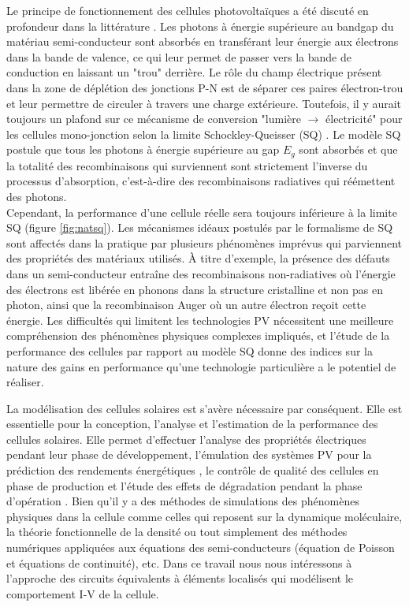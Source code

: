 Le principe de fonctionnement des cellules photovoltaïques a été discuté en profondeur dans la littérature \cite{Fraas2010,  Sze2006, Wenham2013}.
Les photons à énergie supérieure au bandgap du matériau semi-conducteur sont absorbés en transférant leur énergie aux électrons dans la bande de valence, ce qui leur permet de passer vers la bande de conduction en laissant un "trou" derrière. Le rôle du champ électrique présent dans la zone de déplétion des jonctions P-N est de séparer ces paires électron-trou et leur permettre de circuler à travers une charge extérieure. Toutefois, il y aurait toujours un plafond sur ce mécanisme de conversion "lumière $\rightarrow$ électricité" pour les cellules mono-jonction selon la limite Schockley-Queisser (SQ)  \cite{Shockley1961}. Le modèle SQ postule que tous les photons à énergie supérieure au gap $E_g$ sont absorbés et que la totalité des recombinaisons qui surviennent sont strictement l'inverse du processus d'absorption, c'est-à-dire des recombinaisons radiatives qui réémettent des photons.\\
Cependant, la performance d'une cellule réelle sera toujours inférieure à la limite SQ (figure \ref{fig:natsq}). Les mécanismes idéaux postulés par le formalisme de SQ sont affectés dans la pratique par plusieurs phénomènes imprévus qui parviennent des propriétés des matériaux utilisés. À titre d'exemple, la présence des défauts dans un semi-conducteur entraîne des recombinaisons non-radiatives où l'énergie des électrons est libérée en phonons dans la structure cristalline et non pas en photon, ainsi que la recombinaison Auger où un autre électron reçoit cette énergie. Les difficultés qui limitent les technologies PV nécessitent une meilleure compréhension des phénomènes physiques complexes impliqués, et l'étude de la performance des cellules par rapport au modèle SQ donne des indices sur la nature des gains en performance qu'une technologie particulière a le potentiel de réaliser.

La modélisation des cellules solaires est s'avère nécessaire par conséquent. Elle est essentielle pour la conception, l'analyse et l'estimation de la performance des cellules solaires. Elle permet d'effectuer l'analyse des propriétés électriques pendant leur phase de développement, l'émulation des systèmes PV pour la prédiction des rendements énergétiques \cite{Ram2018}, le contrôle de qualité des cellules en phase de production %
et l'étude des effets de dégradation pendant la phase d'opération \cite{Kennerud1969, Jamil2017}. Bien qu'il y a des méthodes de simulations des phénomènes physiques dans la cellule comme celles qui reposent sur la dynamique moléculaire, la théorie fonctionnelle de la densité ou tout simplement des méthodes numériques appliquées aux équations des semi-conducteurs (équation de Poisson et équations de continuité), etc. Dans ce travail nous nous intéressons à l'approche des circuits équivalents à éléments localisés qui modélisent le comportement I-V de la cellule.

